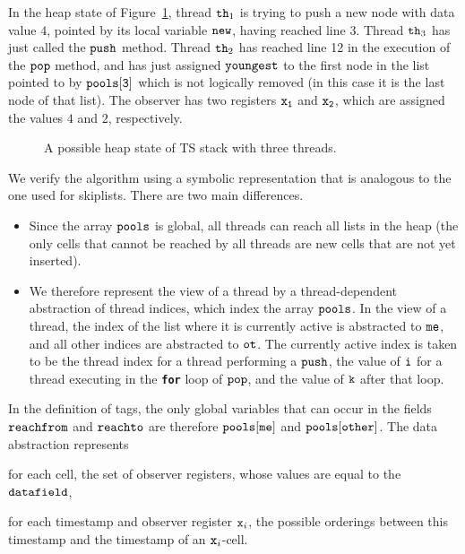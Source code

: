 In the heap state of Figure~\ref{fig:tsshape},
thread ${\tt th}_1$ is trying to push a new node with data value $4$, pointed by its local variable $\tt new$, having reached line 3.
Thread ${\tt th}_3$ has just called the ${\tt push}$ method.
Thread ${\tt th}_2$ has reached line 12 in the execution of the ${\tt pop}$ method,  and has just assigned ${\tt youngest}$ to the first node in the list
pointed to by $\tt pools[3]$ which is not logically removed (in this case it is the last node of that list).
The observer has two registers
$\tt x_1$ and $\tt x_2$, which are assigned the values $4$ and $2$,
respectively.

\begin{figure}
\center
	
\caption{A possible heap state of TS stack with three threads.}
\label{fig:tsshape}
\end{figure} 

We verify the algorithm using a symbolic representation that is analogous
to the one used for skiplists. There are two main differences.
\begin{itemize}
\item
  Since the array $\tt pools$ is global, all threads can reach all lists in
  the heap (the only cells that cannot be reached by all threads are
  new cells that are not yet inserted).
\item
  We therefore represent the view of a thread by a thread-dependent abstraction
  of thread indices, which index the array $\tt pools$. In the view of
  a thread, the index of the list where it is currently active
  is abstracted to $\tt me$, and all other
  indices are abstracted to $\tt ot$. The currently active index is taken to
  be the thread index for a thread performing a $\tt push$, the value of
  $\tt i$ for   a thread executing in the {\tt\bf for} loop of $\tt pop$, and the
  value of $\tt k$ after that loop.
\end{itemize}
In the definition of tags, the only global variables that can occur in
the fields $\mathtt{reachfrom}$ and $\mathtt{reachto}$ are therefore
$\tt pools[me]$ and $\tt pools[other]$. The data abstraction represents
\begin{inparaenum}[(i)]
\item
   for each cell,
   the set of observer registers, whose values are equal to the $\tt data field$,
\item
  for each timestamp and observer register $\mathtt{x}_i$,
  the possible orderings between this timestamp and the timestamp of an
  $\mathtt{x}_i$-cell.
\end{inparaenum}

